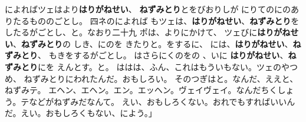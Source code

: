 \documentclass[
    a4paper,
    10pt,
    book]
    {tarticle}
\begin{document}
\newpage
\thispagestyle{fancy}
\begin{spacing}{0.6}
    \fontsize{14pt}{54pt}\selectfont
    {
によればツェはより\textbf{はりがねせい}、
\textbf{ねずみとり}とをびおりしが
にりてのにのありたるもののごとし。
四ネのによれば
もツェは、\textbf{はりがねせい}、\textbf{ねずみとり}を
したるがごとし、と。なおり二十九
ポは、よりにかけて、
ツェびに\textbf{はりがねせい}、\textbf{ねずみとり}の
しき、にのを
きたりと。をするに、
には、\textbf{はりがねせい}、\textbf{ねずみとり}、
もきをするがごとし。
はさらにくのをの
、いに
\textbf{はりがねせい}、\textbf{ねずみとり}にを
えんとす。と。
ははは、ふん、これはもういもない。ツェのやつめ、
ねずみとりにわれたんだ。おもしろい。
そのつぎはと。なんだ、ええと、ねずみテ。
エヘン、エヘン。エン。エッヘン。ヴェイヴェイ。なんだちくしょう。テなどがねずみだなんて。
えい、おもしろくない。おれでもすればいいんだ。えい。おもしろくもない、によう。」
    }
\end{spacing}
\end{document}

